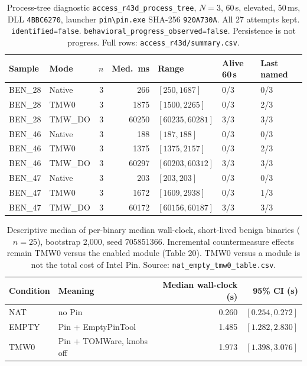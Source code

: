 \begin{table}[!t]
\centering
\caption{Process-tree diagnostic \texttt{access\_r43d\_process\_tree}, $N=3$, 60\,s, elevated, 50\,ms, DLL \texttt{4BBC6270}, launcher \texttt{pin\textbackslash pin.exe} SHA-256 \texttt{920A730A}. All 27 attempts kept. \texttt{identified=false}. \texttt{behavioral\_progress\_observed=false}. Persistence is not progress. Full rows: \texttt{access\_r43d/summary.csv}.}
\label{tab:r43}
\scriptsize
\begin{tabular}{llrrlll}
\hline
Sample & Mode & $n$ & Med.\ ms & Range & Alive 60\,s & Last named \\
\hline
BEN\_28 & Native & 3 & 266 & $[250,1687]$ & 0/3 & 0/3 \\
BEN\_28 & TMW0 & 3 & 1875 & $[1500,2265]$ & 0/3 & 2/3 \\
BEN\_28 & TMW\_DO & 3 & 60250 & $[60235,60281]$ & 3/3 & 3/3 \\
BEN\_46 & Native & 3 & 188 & $[187,188]$ & 0/3 & 0/3 \\
BEN\_46 & TMW0 & 3 & 1375 & $[1375,2157]$ & 0/3 & 2/3 \\
BEN\_46 & TMW\_DO & 3 & 60297 & $[60203,60312]$ & 3/3 & 3/3 \\
BEN\_47 & Native & 3 & 203 & $[203,203]$ & 0/3 & 0/3 \\
BEN\_47 & TMW0 & 3 & 1672 & $[1609,2938]$ & 0/3 & 1/3 \\
BEN\_47 & TMW\_DO & 3 & 60172 & $[60156,60187]$ & 3/3 & 3/3 \\
\hline
\end{tabular}
\end{table}



\begin{table}[!t]
\centering
\caption{Descriptive median of per-binary median wall-clock, short-lived benign binaries ($n=25$), bootstrap 2{,}000, seed 705851366. Incremental countermeasure effects remain TMW0 versus the enabled module (Table 20). TMW0 versus a module is not the total cost of Intel Pin. Source: \texttt{nat\_empty\_tmw0\_table.csv}.}
\label{tab:baselines}
\begin{tabular}{llrr}
\hline
Condition & Meaning & Median wall-clock (s) & 95\% CI (s) \\
\hline
NAT & no Pin & 0.260 & $[0.254, 0.272]$ \\
EMPTY & Pin + EmptyPinTool & 1.485 & $[1.282, 2.830]$ \\
TMW0 & Pin + TOMWare, knobs off & 1.973 & $[1.398, 3.076]$ \\
\hline
\end{tabular}
\end{table}

